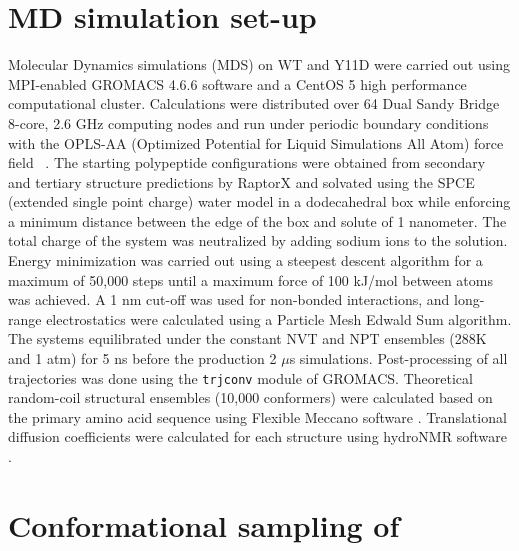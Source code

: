 \section{MD simulation set-up}

Molecular Dynamics simulations (MDS) on WT and Y11D \gct were carried out using MPI-enabled GROMACS 4.6.6 software\cite{hess2008gromacs} and a CentOS 5 high performance computational cluster. Calculations were distributed over 64 Dual Sandy Bridge 8-core, 2.6 GHz computing nodes and run under periodic boundary conditions with the OPLS-AA (Optimized Potential for Liquid Simulations All Atom) force field ~\cite{kaminski2001evaluation}.  The starting \gct polypeptide configurations were obtained from secondary and tertiary structure predictions by RaptorX \cite{kallberg2012template} and solvated using the SPCE (extended single point charge) water model in a dodecahedral box while enforcing a minimum distance between the edge of the box and solute of 1 nanometer. The total charge of the system was neutralized by adding sodium ions to the solution. Energy minimization was carried out using a steepest descent algorithm for a maximum of 50,000 steps until a maximum force of 100 kJ/mol between atoms was achieved. A 1 nm cut-off was used for non-bonded interactions, and long-range electrostatics were calculated using a Particle Mesh Edwald Sum algorithm. The systems equilibrated under the constant NVT and NPT ensembles (288K and 1 atm) for 5 ns before the production 2 $\mu$s simulations. Post-processing of all trajectories was done using the \texttt{trjconv} module of GROMACS. Theoretical random-coil structural ensembles (10,000 conformers) were calculated based on the \gct primary amino acid sequence using Flexible Meccano software \cite{ozenne2012flexible}. Translational diffusion coefficients were calculated for each structure using hydroNMR software \cite{de2000hydronmr}. 


\section{Conformational sampling of \gct}


